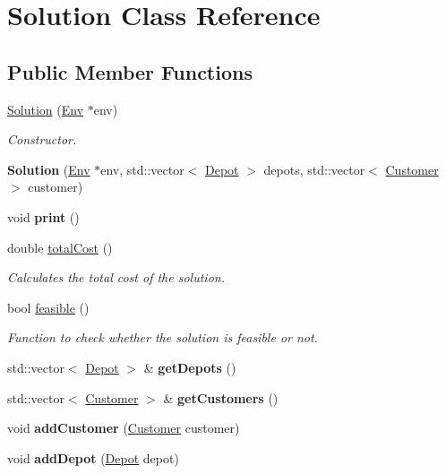 \hypertarget{class_solution}{}\section{Solution Class Reference}
\label{class_solution}
\subsection*{Public Member Functions}
\begin{DoxyCompactItemize}
\item 
\hyperlink{class_solution_a3bdbdf455adecf7ab0f71bbce1efad66}{Solution} (\hyperlink{class_env}{Env} $\ast$env)
\begin{DoxyCompactList}\small\item\em Constructor. \end{DoxyCompactList}\item 
\mbox{\label{class_solution_ae5ae7771a56ee48728a905cd264730ac}} 
{\bfseries Solution} (\hyperlink{class_env}{Env} $\ast$env, std\+::vector$<$ \hyperlink{class_depot}{Depot} $>$ depots, std\+::vector$<$ \hyperlink{class_customer}{Customer} $>$ customer)
\item 
\mbox{\label{class_solution_a22519dee8cecd124e2e112a3a9bc505c}} 
void {\bfseries print} ()
\item 
double \hyperlink{class_solution_a227aaabdf34fbd2e01283728a5a344fe}{total\+Cost} ()
\begin{DoxyCompactList}\small\item\em Calculates the total cost of the solution. \end{DoxyCompactList}\item 
bool \hyperlink{class_solution_a13e4ebdccdbc8c572a82fb21254022d0}{feasible} ()
\begin{DoxyCompactList}\small\item\em Function to check whether the solution is feasible or not. \end{DoxyCompactList}\item 
\mbox{\label{class_solution_ab950712d080e8fcfda4d7f5b7126f1e6}} 
std\+::vector$<$ \hyperlink{class_depot}{Depot} $>$ \& {\bfseries get\+Depots} ()
\item 
\mbox{\label{class_solution_a535607b6b1cfd652f783c18f742be458}} 
std\+::vector$<$ \hyperlink{class_customer}{Customer} $>$ \& {\bfseries get\+Customers} ()
\item 
\mbox{\label{class_solution_a360f5711f6da7daba2d4eff39bfb00fc}} 
void {\bfseries add\+Customer} (\hyperlink{class_customer}{Customer} customer)
\item 
\mbox{\label{class_solution_af9d6aadb375d6e9ddadc8fcf31a53cf6}} 
void {\bfseries add\+Depot} (\hyperlink{class_depot}{Depot} depot)
\end{DoxyCompactItemize}


